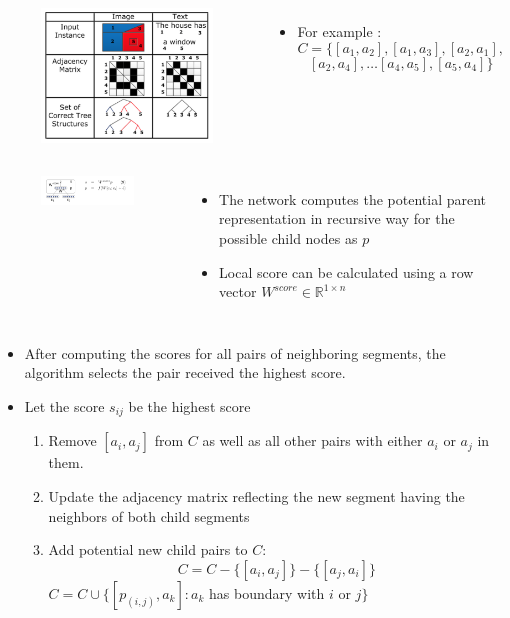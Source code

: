 \documentclass{beamer}
\begin{document}
{
	\begin{columns}
	\begin{figure}[ht]  
		\begin{center}
			\includegraphics[width=2.1in]{images/fig3.png}   
		\end{center}   
	\end{figure}
	\begin{itemize}
		\item For example :
		$$ C = \{[a_1, a_2], [a_1, a_3], [a_2, a_1], $$ 
		$$ [a_2, a_4], \dots  [a_4,a_5], [a_5, a_4]\} $$
	\end{itemize}
	\end{columns}
}
\frame
{
	\begin{columns}
	\column{0.4\textwidth}
	\begin{figure}[ht]  
		\begin{center}
			\includegraphics[width=2.25in]{images/fig4.png}   
		\end{center}   
	\end{figure}
	\column{0.6\textwidth} 
	\begin{itemize}
		\item The network computes the potential 
		parent representation in recursive way for the possible child nodes as $ \textit{p} $
		\item Local score can be calculated using a row vector 
		$ W^{score} \in \mathbb{R}^{1\times n} $
	\end{itemize}
	\end{columns}
}
\frame
{
	\begin{itemize}
		\item After computing the scores for all pairs of neighboring segments, 
		the algorithm selects the pair received the highest score. 
		\item Let the score $s_{ij}$ be the highest score
		\begin{enumerate}
			\item Remove $[a_i, a_j] $ from $C$ as well as all other pairs with 
			either $a_i$ or $a_j$ in them. 
			\item Update the adjacency matrix reflecting the new segment having the neighbors of both child segments
			\item Add potential new child pairs to $C$:
			$$ C = C - \{[a_i,a_j]\} - \{[a_j, a_i]\} $$
			$ C = C \cup \{[p_{(i,j)}, a_k]: a_k $ has boundary with $i$ or $j\}$
		\end{enumerate}
	\end{itemize}
}
\end{document}
